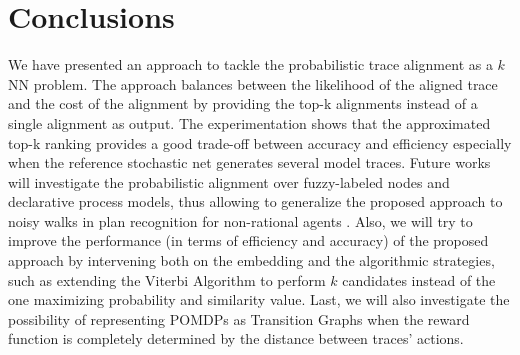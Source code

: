 
\section{Conclusions}
\label{sec:conclusion}

We have presented an approach to tackle the probabilistic trace alignment as a $k$NN problem.
The approach balances between the likelihood of the aligned trace and the cost of the alignment by providing the top-k alignments instead of a single alignment as output. The experimentation shows that the approximated top-k ranking provides a good trade-off between accuracy and efficiency especially when the reference stochastic net generates several model traces.
Future works will investigate the probabilistic alignment over fuzzy-labeled nodes and declarative process models, thus allowing to generalize the proposed approach to noisy walks in plan recognition for non-rational agents \cite{RamirezG10}. Also, we will try to improve the performance (in terms of efficiency and accuracy) of the proposed approach by intervening both on the embedding and the algorithmic strategies, such as extending the Viterbi Algorithm  to perform $k$ candidates instead of the one maximizing probability and similarity value. Last, we will also investigate the possibility of representing POMDPs as Transition Graphs when the reward function is completely determined by the distance between traces' actions.

